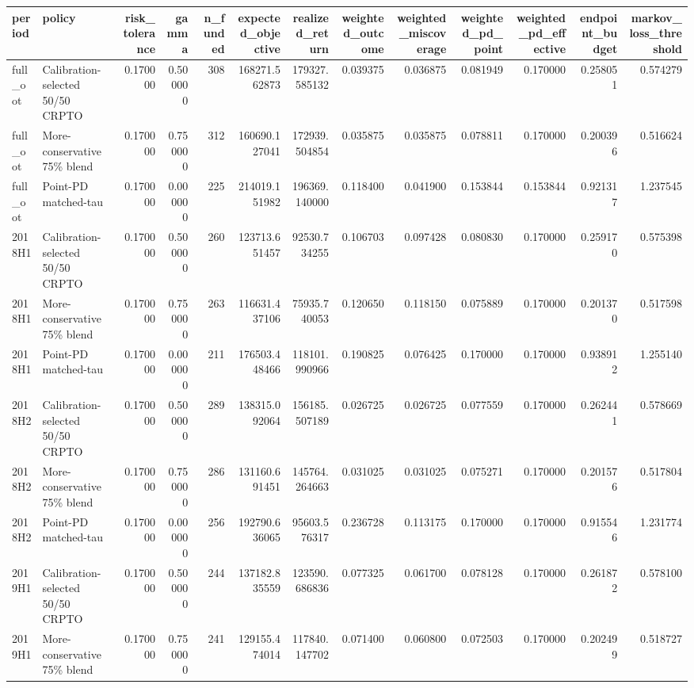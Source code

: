 \begin{tabular}{llrrrrrrrrrrr}
\toprule
period & policy & risk\_tolerance & gamma & n\_funded & expected\_objective & realized\_return & weighted\_outcome & weighted\_miscoverage & weighted\_pd\_point & weighted\_pd\_effective & endpoint\_budget & markov\_loss\_threshold \\
\midrule
full\_oot & Calibration-selected 50/50 CRPTO & 0.170000 & 0.500000 & 308 & 168271.562873 & 179327.585132 & 0.039375 & 0.036875 & 0.081949 & 0.170000 & 0.258051 & 0.574279 \\
full\_oot & More-conservative 75\% blend & 0.170000 & 0.750000 & 312 & 160690.127041 & 172939.504854 & 0.035875 & 0.035875 & 0.078811 & 0.170000 & 0.200396 & 0.516624 \\
full\_oot & Point-PD matched-tau & 0.170000 & 0.000000 & 225 & 214019.151982 & 196369.140000 & 0.118400 & 0.041900 & 0.153844 & 0.153844 & 0.921317 & 1.237545 \\
2018H1 & Calibration-selected 50/50 CRPTO & 0.170000 & 0.500000 & 260 & 123713.651457 & 92530.734255 & 0.106703 & 0.097428 & 0.080830 & 0.170000 & 0.259170 & 0.575398 \\
2018H1 & More-conservative 75\% blend & 0.170000 & 0.750000 & 263 & 116631.437106 & 75935.740053 & 0.120650 & 0.118150 & 0.075889 & 0.170000 & 0.201370 & 0.517598 \\
2018H1 & Point-PD matched-tau & 0.170000 & 0.000000 & 211 & 176503.448466 & 118101.990966 & 0.190825 & 0.076425 & 0.170000 & 0.170000 & 0.938912 & 1.255140 \\
2018H2 & Calibration-selected 50/50 CRPTO & 0.170000 & 0.500000 & 289 & 138315.092064 & 156185.507189 & 0.026725 & 0.026725 & 0.077559 & 0.170000 & 0.262441 & 0.578669 \\
2018H2 & More-conservative 75\% blend & 0.170000 & 0.750000 & 286 & 131160.691451 & 145764.264663 & 0.031025 & 0.031025 & 0.075271 & 0.170000 & 0.201576 & 0.517804 \\
2018H2 & Point-PD matched-tau & 0.170000 & 0.000000 & 256 & 192790.636065 & 95603.576317 & 0.236728 & 0.113175 & 0.170000 & 0.170000 & 0.915546 & 1.231774 \\
2019H1 & Calibration-selected 50/50 CRPTO & 0.170000 & 0.500000 & 244 & 137182.835559 & 123590.686836 & 0.077325 & 0.061700 & 0.078128 & 0.170000 & 0.261872 & 0.578100 \\
2019H1 & More-conservative 75\% blend & 0.170000 & 0.750000 & 241 & 129155.474014 & 117840.147702 & 0.071400 & 0.060800 & 0.072503 & 0.170000 & 0.202499 & 0.518727 \\

\end{tabular}
